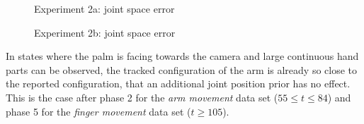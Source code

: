 \begin{figure}[h]
\centering
{}
\caption{Experiment 2a: joint space error}
\label{fig:am_joint_error}
\end{figure}

\begin{figure}[h]
\centering
{}
\caption{Experiment 2b: joint space error}
\label{fig:fm_joint_error}
\end{figure}

In states where the palm is facing towards the camera and large continuous hand parts can be observed, the tracked configuration of the arm is already so close to the reported configuration, that an additional joint position prior has no effect. This is the case after phase 2 for the \textit{arm movement} data set ($55\leq t \leq84$) and phase 5 for the \textit{finger movement} data set ($t \geq 105$).


